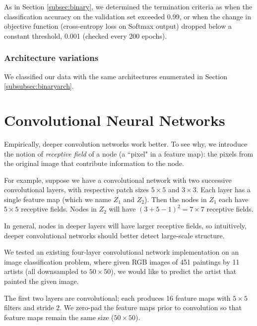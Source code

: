 \documentclass{article}
\begin{document}
\begin{multicols}{2}
As in Section \ref{subsec:binary}, we determined the termination criteria as
when the classification accuracy on the validation set exceeded 0.99,
or when the change in objective function (cross-entropy loss on Softmax output)
dropped below a constant threshold, 0.001 (checked every 200 epochs).

\subsubsection{Architecture variations}

We classified our data with the same architectures enumerated in Section \ref{subsubsec:binaryarch}.


\section{Convolutional Neural Networks}


Empirically, deeper convolution networks work better.
To see why, we introduce the notion of \emph{receptive field}
of a node (a ``pixel" in a feature map):
the pixels from the original image that contribute information
to the node.

For example,
suppose we have a convolutional network
with two successive convolutional layers,
with respective patch sizes $5\times 5$ and $3\times 3$.
Each layer has a single feature map (which we name $Z_1$ and $Z_2$).
Then the nodes in $Z_1$ each have $5\times 5$ receptive fields.
Nodes in $Z_2$ will have $(3 + 5 - 1)^2 = 7\times 7$ receptive fields.

In general,
nodes in deeper layers will have larger receptive fields,
so intuitively,
deeper convolutional networks should better detect large-scale structure.

We tested an existing four-layer convolutional network implementation
on an image classification problem,
where given RGB images of 451 paintings by 11 artists
(all downsampled to $50\times 50$),
we would like to predict the artist that painted the given image.

The first two layers are convolutional;
each produces 16 feature maps
with $5\times 5$ filters and stride $2$.
We zero-pad the feature maps prior to convolution
so that feature maps remain the same size ($50\times 50$).


\end{multicols}
\end{document}
